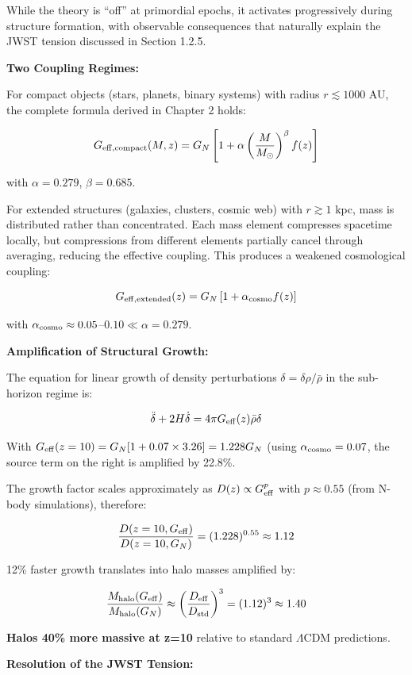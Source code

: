 \documentclass[10pt,a4paper]{article}
\begin{document}
While the theory is ``off'' at primordial epochs, it activates
progressively during structure formation, with observable consequences
that naturally explain the JWST tension discussed in Section 1.2.5.

\textbf{Two Coupling Regimes:}

For compact objects (stars, planets, binary systems) with radius
\(r \lesssim 1000\) AU, the complete formula derived in Chapter 2 holds:

\[G_{\rm eff,compact}(M,z) = G_N\left[1 + \alpha \left(\frac{M}{M_\odot}\right)^\beta f(z)\right]\]

with \(\alpha = 0.279\), \(\beta = 0.685\).

For extended structures (galaxies, clusters, cosmic web) with
\(r \gtrsim 1\) kpc, mass is distributed rather than concentrated. Each
mass element compresses spacetime locally, but compressions from
different elements partially cancel through averaging, reducing the
effective coupling. This produces a weakened cosmological coupling:

\[G_{\rm eff,extended}(z) = G_N\left[1 + \alpha_{\rm cosmo} f(z)\right]\]

with \(\alpha_{\rm cosmo} \approx 0.05\)--\(0.10 \ll \alpha = 0.279\).

\textbf{Amplification of Structural Growth:}

The equation for linear growth of density perturbations
\(\delta = \delta\rho/\bar\rho\) in the sub-horizon regime is:

\[\ddot{\delta} + 2H\dot{\delta} = 4\pi G_{\rm eff}(z) \bar\rho \delta\]

With \(G_{\rm eff}(z=10) = G_N[1 + 0.07 \times 3.26] = 1.228 G_N\)
(using \(\alpha_{\rm cosmo} = 0.07\), the source term on the right is
amplified by 22.8\%.

The growth factor scales approximately as \(D(z) \propto G_{\rm eff}^p\)
with \(p \approx 0.55\) (from N-body simulations), therefore:

\[\frac{D(z=10, G_{\rm eff})}{D(z=10, G_N)} = (1.228)^{0.55} \approx 1.12\]

12\% faster growth translates into halo masses amplified by:

\[\frac{M_{\rm halo}(G_{\rm eff})}{M_{\rm halo}(G_N)} \approx \left(\frac{D_{\rm eff}}{D_{\rm std}}\right)^3 = (1.12)^3 \approx 1.40\]

\textbf{Halos 40\% more massive at z=10} relative to standard
\(\Lambda\)CDM predictions.

\textbf{Resolution of the JWST Tension:}
\end{document}
